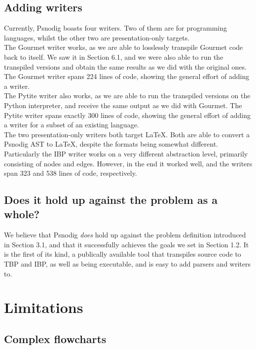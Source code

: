 \subsection{Adding writers}

Currently, Psnodig boasts four writers. Two of them are for programming languages, whilst the other two are presentation-only targets. \\

The Gourmet writer works, as we are able to losslessly transpile Gourmet code back to itself. We saw it in Section 6.1, and we were also able to run the transpiled versions and obtain the same results as we did with the original ones. The Gourmet writer spans 224 lines of code, showing the general effort of adding a writer. \\

The Pytite writer also works, as we are able to run the transpiled versions on the Python interpreter, and receive the same output as we did with Gourmet. The Pytite writer spans exactly 300 lines of code, showing the general effort of adding a writer for a subset of an existing language. \\

The two presentation-only writers both target LaTeX. Both are able to convert a Psnodig AST to LaTeX, despite the formats being somewhat different. Particularly the IBP writer works on a very different abstraction level, primarily consisting of nodes and edges. However, in the end it worked well, and the writers span 323 and 538 lines of code, respectively.

\subsection{Does it hold up against the problem as a whole?}

We believe that Psnodig \textit{does} hold up against the problem definition introduced in Section 3.1, and that it successfully achieves the goals we set in Section 1.2. It is the first of its kind, a publically available tool that transpiles source code to TBP and IBP, as well as being executable, and is easy to add parsers and writers to.

\section{Limitations}

\subsection{Complex flowcharts}

